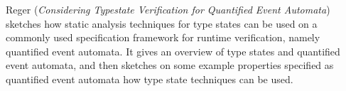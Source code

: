 

Reger
\cite{isola-2016-reger}
({\em Considering Typestate Verification for Quantified 
Event Automata})
sketches how static analysis techniques for type states can be used on a commonly used specification framework for runtime verification, namely quantified event automata.
It gives an overview of type states and quantified event automata, and
then sketches on some example properties specified as quantified event
automata how type state techniques can be used.
